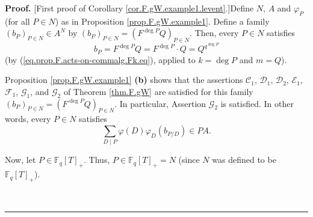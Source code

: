 \documentclass[numbers=enddot,12pt,final,onecolumn,notitlepage]{scrartcl}%
\theoremstyle{definition}
\newenvironment{proof}[1][Proof]{\noindent\textbf{#1.} }{\ \rule{0.5em}{0.5em}}
\let\sumnonlimits\sum
\renewcommand{\sum}{\sumnonlimits\limits}
\begin{document}
\begin{proof}
[First proof of Corollary \ref{cor.F.gW.example1.levent}.]Define $N$, $A$ and
$\varphi_{P}$ (for all $P\in N$) as in Proposition \ref{prop.F.gW.example1}.
Define a family $\left(  b_{P}\right)  _{P\in N}\in A^{N}$ by $\left(
b_{P}\right)  _{P\in N}=\left(  F^{\deg P}Q\right)  _{P\in N}$. Then, every
$P\in N$ satisfies%
\begin{equation}
b_{P}=F^{\deg P}Q=F^{\deg P}\cdot Q=Q^{q^{\deg P}}
\label{pf.cor.F.gW.example1.levent.bP=1}%
\end{equation}
(by (\ref{eq.prop.F.acts-on-commalg.Fk.eq}), applied to $k=\deg P$ and $m=Q$).

Proposition \ref{prop.F.gW.example1} \textbf{(b)} shows that the assertions
$\mathcal{C}_{1}$, $\mathcal{D}_{1}$, $\mathcal{D}_{2}$, $\mathcal{E}_{1}$,
$\mathcal{F}_{1}$, $\mathcal{G}_{1}$, and $\mathcal{G}_{2}$ of Theorem
\ref{thm.F.gW} are satisfied for this family $\left(  b_{P}\right)  _{P\in
N}=\left(  F^{\deg P}Q\right)  _{P\in N}$. In particular, Assertion
$\mathcal{G}_{2}$ is satisfied. In other words, every $P\in N$ satisfies%
\begin{equation}
\sum_{D\mid P}\varphi\left(  D\right)  \varphi_{D}\left(  b_{P/D}\right)  \in
PA. \label{pf.cor.F.gW.example1.levent.2}%
\end{equation}


Now, let $P\in\mathbb{F}_{q}\left[  T\right]  _{+}$. Thus, $P\in\mathbb{F}%
_{q}\left[  T\right]  _{+}=N$ (since $N$ was defined to be $\mathbb{F}%
_{q}\left[  T\right]  _{+}$).


\end{proof}
\end{document}
